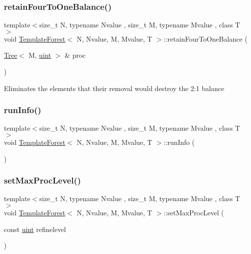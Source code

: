 \subsubsection{\texorpdfstring{retain\+Four\+To\+One\+Balance()}{retainFourToOneBalance()}}
{\footnotesize\ttfamily template$<$size\+\_\+t N, typename Nvalue , size\+\_\+t M, typename Mvalue , class T $>$ \\
void \mbox{\hyperlink{classTemplateForest}{Template\+Forest}}$<$ N, Nvalue, M, Mvalue, T $>$\+::retain\+Four\+To\+One\+Balance (\begin{DoxyParamCaption}\item[{\mbox{\hyperlink{classTree}{Tree}}$<$ M, \mbox{\hyperlink{definitions_8h_a69aa29b598b851b0640aa225a9e5d61d}{uint}} $>$ \&}]{proc }\end{DoxyParamCaption})}

Eliminates the elements that their removal would destroy the 2\+:1 balance \mbox{\label{classTemplateForest_a6894f2a77f8eba8e06bbbdf77ff39b61}} 
\subsubsection{\texorpdfstring{run\+Info()}{runInfo()}}
{\footnotesize\ttfamily template$<$size\+\_\+t N, typename Nvalue , size\+\_\+t M, typename Mvalue , class T $>$ \\
void \mbox{\hyperlink{classTemplateForest}{Template\+Forest}}$<$ N, Nvalue, M, Mvalue, T $>$\+::run\+Info (\begin{DoxyParamCaption}{ }\end{DoxyParamCaption})}

\mbox{\label{classTemplateForest_aca233428d2484e70653d21ddfd8bc790}} 
\subsubsection{\texorpdfstring{set\+Max\+Proc\+Level()}{setMaxProcLevel()}}
{\footnotesize\ttfamily template$<$size\+\_\+t N, typename Nvalue , size\+\_\+t M, typename Mvalue , class T $>$ \\
void \mbox{\hyperlink{classTemplateForest}{Template\+Forest}}$<$ N, Nvalue, M, Mvalue, T $>$\+::set\+Max\+Proc\+Level (\begin{DoxyParamCaption}\item[{const \mbox{\hyperlink{definitions_8h_a69aa29b598b851b0640aa225a9e5d61d}{uint}}}]{refinelevel }\end{DoxyParamCaption})}



